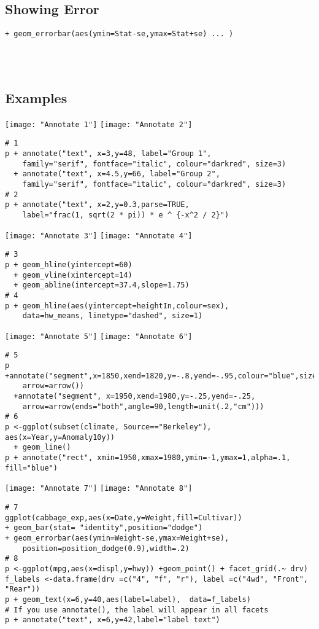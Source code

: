\documentclass[]{article}
\begin{document}
\subsection{Showing Error}
\begin{verbatim}
+ geom_errorbar(aes(ymin=Stat-se,ymax=Stat+se) ... )
\end{verbatim}
\begin{tabular}{l l}
\end{tabular} \\


\subsection{Examples}
\texttt{[image: "Annotate 1"]}
\texttt{[image: "Annotate 2"]}
\begin{verbatim}
# 1
p + annotate("text", x=3,y=48, label="Group 1", 
	family="serif", fontface="italic", colour="darkred", size=3) 
  + annotate("text", x=4.5,y=66, label="Group 2", 
  	family="serif", fontface="italic", colour="darkred", size=3)
# 2
p + annotate("text", x=2,y=0.3,parse=TRUE, 
	label="frac(1, sqrt(2 * pi)) * e ^ {-x^2 / 2}")
\end{verbatim}

\texttt{[image: "Annotate 3"]}
\texttt{[image: "Annotate 4"]}
\begin{verbatim}
# 3
p + geom_hline(yintercept=60) 
  + geom_vline(xintercept=14) 
  + geom_abline(intercept=37.4,slope=1.75)
# 4
p + geom_hline(aes(yintercept=heightIn,colour=sex), 
	data=hw_means, linetype="dashed", size=1)
\end{verbatim}

\texttt{[image: "Annotate 5"]}
\texttt{[image: "Annotate 6"]}
\begin{verbatim}
# 5
p +annotate("segment",x=1850,xend=1820,y=-.8,yend=-.95,colour="blue",size=2,
	arrow=arrow()) 
  +annotate("segment", x=1950,xend=1980,y=-.25,yend=-.25,
  	arrow=arrow(ends="both",angle=90,length=unit(.2,"cm")))
# 6
p <-ggplot(subset(climate, Source=="Berkeley"), aes(x=Year,y=Anomaly10y)) 
  + geom_line()
p + annotate("rect", xmin=1950,xmax=1980,ymin=-1,ymax=1,alpha=.1, fill="blue")
\end{verbatim}

\texttt{[image: "Annotate 7"]}
\texttt{[image: "Annotate 8"]}
\begin{verbatim}
# 7
ggplot(cabbage_exp,aes(x=Date,y=Weight,fill=Cultivar)) 
+ geom_bar(stat= "identity",position="dodge") 
+ geom_errorbar(aes(ymin=Weight-se,ymax=Weight+se), 
	position=position_dodge(0.9),width=.2) 
# 8
p <-ggplot(mpg,aes(x=displ,y=hwy)) +geom_point() + facet_grid(.~ drv)
f_labels <-data.frame(drv =c("4", "f", "r"), label =c("4wd", "Front", "Rear"))
p + geom_text(x=6,y=40,aes(label=label),  data=f_labels)
# If you use annotate(), the label will appear in all facets
p + annotate("text", x=6,y=42,label="label text")
\end{verbatim}
\end{document}
